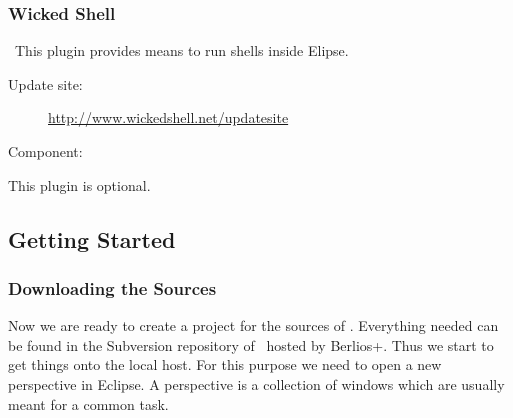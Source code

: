 \subsubsection{Wicked Shell}\
This plugin provides means to run shells inside Elipse.
\begin{description}
\item [Update site:] \url{http://www.wickedshell.net/updatesite}
\item [Component:] \menu{Wicked Shell}
\end{description}
This plugin is optional.
%


\subsection{Getting Started}

\subsubsection{Downloading the Sources}

Now we are ready to create a project for the sources of \ExTeX.
Everything needed can be found in the Subversion repository of \ExTeX\ 
hosted by \+Berlios+. Thus we start to get things onto the local host.
For this purpose we need to open a new perspective in Eclipse. A
perspective is a collection of windows which are usually meant for a
common task.

